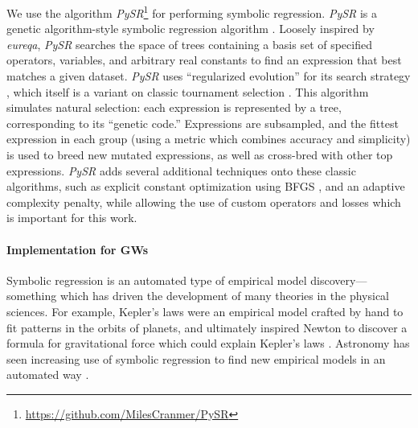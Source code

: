 \documentclass[nohyperref]{article}
\newcommand\pysr{\textit{PySR}\xspace}
\theoremstyle{plain}
\theoremstyle{definition}
\theoremstyle{remark}
\begin{document}
We use the algorithm \pysr\footnote{\url{https://github.com/MilesCranmer/PySR}} \cite{cranmerPySRFastParallelized2020} for performing symbolic regression.
\pysr is a genetic algorithm-style symbolic regression algorithm
\citep[see][for an early example]{kozaGeneticProgrammingMeans1994}.
Loosely inspired by \textit{eureqa},
\pysr searches the space of trees 
containing a basis set of specified operators, variables, and arbitrary real constants
to find an expression that best matches a given dataset.
\pysr uses ``regularized evolution'' for its search strategy 
\cite{realRegularizedEvolutionImage2019,realAutoMLZeroEvolvingMachine2020},
which itself is a variant on classic tournament selection
\cite{brindleGeneticAlgorithmsFunction1980,goldbergComparativeAnalysisSelection1991}.
This algorithm simulates natural selection: each expression is represented by a tree, corresponding to its ``genetic code.''
Expressions are subsampled, and the fittest expression in each group (using a metric which combines accuracy and simplicity) is used to breed new mutated expressions, as well as cross-bred with other top expressions.
\pysr adds several additional techniques onto these classic algorithms, such as explicit constant optimization using BFGS \cite{fletcherPracticalMethodsOptimization1988}, and an adaptive complexity penalty, while allowing the use of custom operators and losses which is important for this work.


\paragraph{Implementation for GWs}
Symbolic regression is an automated type of empirical model discovery---something which has driven the development of many theories in the physical sciences.
For example, Kepler's laws were an empirical model crafted by hand to fit patterns in the orbits of planets, and ultimately inspired Newton to discover a formula for gravitational force which could explain Kepler's laws \citep[see][for a review of this history]{hawkingShouldersGiantsGreat2004}.
Astronomy has seen increasing use of symbolic regression to find new empirical models in an automated way \citep[e.g.,][]{grahamMachineassistedDiscoveryRelationships2013,cranmerDiscoveringSymbolicModels2020,wadekarModelingAssemblyBias2020,delgadoModelingGalaxyhaloConnection2021,cranmerHistogramPoolingOperators2021,shaoFindingUniversalRelations2021}.
\end{document}
